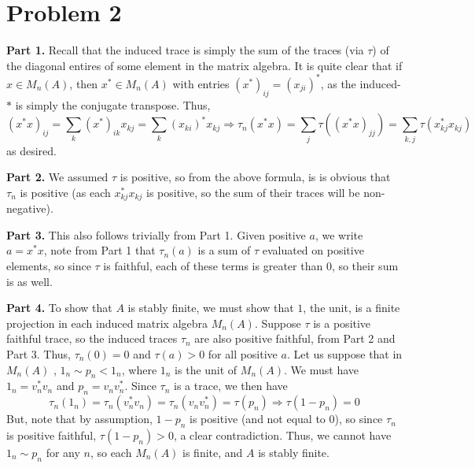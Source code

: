 \documentclass[aps,pra,showpacs,notitlepage,onecolumn,superscriptaddress,nofootinbib]{revtex4-1}
\theoremstyle{definition}
\begin{document}
    \section{Problem 2}

    \noindent \textbf{Part 1.} Recall that the induced trace is simply the sum of the traces (via $\tau$) of the diagonal entires of some element in the matrix algebra. It is quite clear that
    if $x \in M_n(A)$, then $x^{*} \in M_n(A)$ with entries $(x^{*})_{ij} = (x_{ji})^{*}$, as the induced-$*$ is simply the conjugate transpose. Thus,
    $$(x^{*} x)_{ij} = \sum_{k} (x^{*})_{ik} x_{kj} = \sum_{k} (x_{ki})^{*} x_{kj} \Longrightarrow \tau_n(x^{*} x) = \sum_{j} \tau((x^{*} x)_{jj}) = \sum_{k, j} \tau( x_{kj}^{*} x_{kj} )$$
    as desired.
    \newline

    \noindent \textbf{Part 2.} We assumed $\tau$ is positive, so from the above formula, is is obvious that $\tau_n$ is positive (as each $x_{kj}^{*} x_{kj}$ is positive, so the sum of their traces will be non-negative).
    \newline

    \noindent \textbf{Part 3.} This also follows trivially from Part 1. Given positive $a$, we write $a = x^{*} x$, note from Part 1 that $\tau_n(a)$ is a sum of $\tau$ evaluated on positive elements, so
    since $\tau$ is faithful, each of these terms is greater than $0$, so their sum is as well.
    \newline

    \noindent \textbf{Part 4.} To show that $A$ is stably finite, we must show that $1$, the unit, is a finite projection in each induced matrix algebra $M_n(A)$.
    Suppose $\tau$ is a positive faithful trace, so the induced traces $\tau_n$ are also positive faithful, from Part 2 and Part 3. Thus, $\tau_n(0) = 0$ and $\tau(a) > 0$
    for all positive $a$. Let us suppose that in $M_n(A)$ , $1_n \sim p_n < 1_n$, where $1_n$ is the unit of $M_n(A)$. We must have $1_n = v_n^{*} v_n$ and $p_n = v_n v_n^{*}$. Since $\tau_n$ is a trace,
    we then have
    \begin{equation}
      \tau_n(1_n) = \tau_n(v_n^{*} v_n) = \tau_n(v_n v_n^{*}) = \tau(p_n) \Longrightarrow \tau(1 - p_n) = 0
    \end{equation}
    But, note that by assumption, $1 - p_n$ is positive (and not equal to $0$), so since $\tau_n$ is positive faithful, $\tau(1 - p_n) > 0$, a clear contradiction. Thus,
    we cannot have $1_n \sim p_n$ for any $n$, so each $M_n(A)$ is finite, and $A$ is stably finite.
\end{document}
